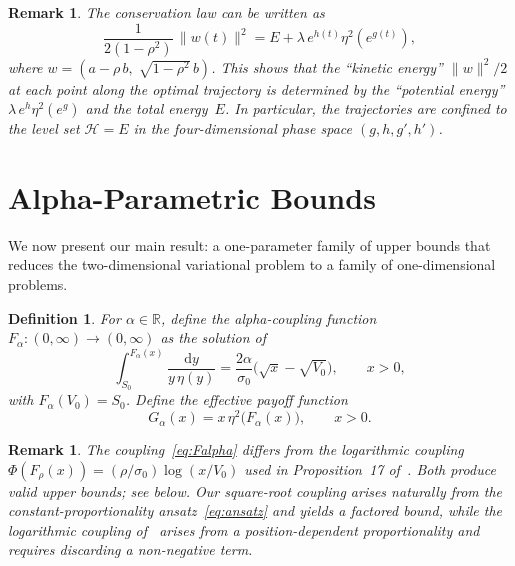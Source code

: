 \documentclass[12pt]{article}
\newtheorem{remark}[theorem]{Remark}
\newtheorem{definition}[theorem]{Definition}
\newcommand{\R}{\mathbb{R}}
\newcommand{\dd}{\mathrm{d}}
\begin{document}
\begin{remark}\label{rem:energy}
The conservation law can be written as
\begin{equation}\label{eq:energy}
\frac{1}{2(1-\rho^2)}\,\|w(t)\|^2 = E + \lambda\,e^{h(t)}\eta^2(e^{g(t)}),
\end{equation}
where $w = (a-\rho\,b,\;\sqrt{1-\rho^2}\,b)$. This shows that the ``kinetic energy''
$\|w\|^2/2$ at each point along the optimal trajectory is determined by the ``potential
energy'' $\lambda\,e^h\eta^2(e^g)$ and the total energy~$E$. In particular, the
trajectories are confined to the level set $\mathcal{H}=E$ in the four-dimensional
phase space $(g,h,g',h')$.
\end{remark}


\section{Alpha-Parametric Bounds}\label{sec:alpha}

We now present our main result: a one-parameter family of upper bounds that reduces the
two-dimensional variational problem to a family of one-dimensional problems.

\begin{definition}\label{def:Falpha}
For $\alpha\in\R$, define the \emph{alpha-coupling function} $F_\alpha:
(0,\infty)\to(0,\infty)$ as the solution of
\begin{equation}\label{eq:Falpha}
\int_{S_0}^{F_\alpha(x)}\frac{\dd y}{y\,\eta(y)}
  = \frac{2\alpha}{\sigma_0}\bigl(\sqrt{x} - \sqrt{V_0}\bigr), \qquad x > 0,
\end{equation}
with $F_\alpha(V_0) = S_0$. Define the \emph{effective payoff function}
\begin{equation}\label{eq:Galpha}
G_\alpha(x) = x\,\eta^2\bigl(F_\alpha(x)\bigr), \qquad x > 0.
\end{equation}
\end{definition}

\begin{remark}\label{rem:coupling_compare}
The coupling~\eqref{eq:Falpha} differs from the logarithmic coupling
$\Phi(F_\rho(x)) = (\rho/\sigma_0)\log(x/V_0)$ used in Proposition~17
of~\cite{PWZ2025}. Both produce valid upper bounds; see 
below. Our square-root coupling arises naturally from the constant-proportionality
ansatz~\eqref{eq:ansatz} and yields a factored bound, while the logarithmic coupling
of~\cite{PWZ2025} arises from a position-dependent proportionality and requires
discarding a non-negative term.
\end{remark}
\end{document}
